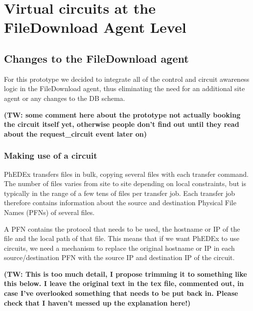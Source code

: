 \section{Virtual circuits at the FileDownload Agent Level}

\subsection{Changes to the FileDownload agent}

For this prototype we decided to integrate all of the control and circuit awareness
logic in the FileDownload agent, thus eliminating the need for an additional site 
agent or any changes to the DB schema.

\textbf{(TW: some comment here about the prototype not actually booking the circuit itself yet, otherwise people don't find out until they read about the request\_circuit event later on)}

\subsubsection{Making use of a circuit}

PhEDEx transfers files in bulk, copying several files with each transfer command. The number of files varies from
site to site depending on local constraints, but is typically in the range of a few tens of files per transfer job. Each transfer job therefore contains information about the source and destination Physical File Names (PFNs) of several files.

A PFN contains the protocol that needs to be used, the hostname or IP of the file
and the local path of that file. This means that if we want PhEDEx to use
circuits, we need a mechanism to replace the original hostname or IP in each 
source/destination PFN with the source IP and destination IP of the circuit.

\textbf{(TW: This is too much detail, I propose trimming it to something like this below. I leave the original text in the tex
file, commented out, in case I've overlooked something that needs to be put back in. Please check that I haven't messed up the
explanation here!)}


